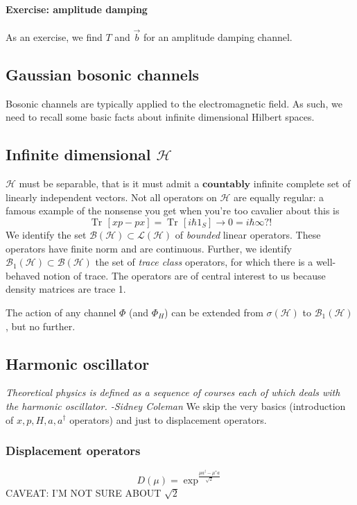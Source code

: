 \documentclass[a4paper, 11pt]{article}
\newcommand{\Tr}{\mathop{\mathrm{Tr}\!}{}}
\newcommand{\HH}{\mathcal{H}}
\begin{document}
	\paragraph{Exercise: amplitude damping} As an exercise, we find $T$ and $\vec{b}$ for an amplitude damping channel.
	
	\subsection{Gaussian bosonic channels}
	Bosonic channels are typically applied to the electromagnetic field. As such, we need to recall some basic facts about infinite dimensional Hilbert spaces.
	\subsection{Infinite dimensional $\HH$}
	$\HH$ must be separable, that is it must admit a $\mathbf{countably}$ infinite complete set of linearly independent vectors.
	Not all operators on $\HH$ are equally regular: a famous example of the nonsense you get when you're too cavalier about this is
	\[ \Tr\left[ xp - px \right] = \Tr\left[ i\hbar 1_S \right] \rightarrow 0 = i\hbar\infty?! \]
	We identify the set $\mathcal{B}(\HH) \subset \mathcal{L}(\HH)$ of \emph{bounded} linear operators. These operators have finite norm and are continuous. Further, we identify $\mathcal{B}_1(\HH) \subset \mathcal{B}(\HH)$ the set of \emph{trace class} operators, for which there is a well-behaved notion of trace. The operators are of central interest to us because density matrices are trace 1.
	
	The action of any channel $\Phi$ (and $\Phi_H$) can be extended from $\sigma(\HH)$ to $\mathcal{B}_1(\HH)$, but no further.
	
	\subsection{Harmonic oscillator}
	\emph{Theoretical physics is defined as a sequence of courses each of which deals with the harmonic oscillator. -Sidney Coleman}
	We skip the very basics (introduction of $x,p,H,a,a^\dagger$ operators) and just to displacement operators.
	\subsubsection{Displacement operators}
	\label{subsub:disp.op.}
	\[ D(\mu) = \exp^{\frac{\mu a^\dagger - \mu^* a}{\sqrt{2}}} \]
	CAVEAT: I'M NOT SURE ABOUT $\sqrt{2}$
	
\end{document}
